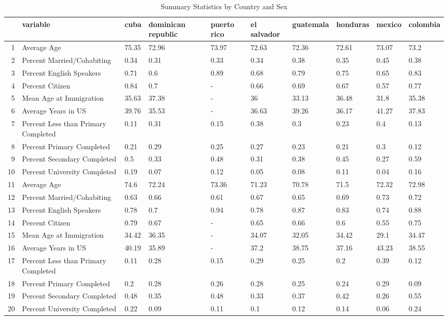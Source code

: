 \begin{table}[ht]
\centering
\hspace*{-1cm} %
\caption{Summary Statistics by Country and Sex} 
\label{table2}
\begingroup\small
\begin{tabular}{rlllllllll}
  \hline
 & variable & cuba & dominican republic & puerto rico & el salvador & guatemala & honduras & mexico & colombia \\ 
  \hline
1 & Average Age & 75.35 & 72.96 & 73.97 & 72.63 & 72.36 & 72.61 & 73.07 & 73.2 \\ 
  2 & Percent Married/Cohabiting & 0.34 & 0.31 & 0.33 & 0.34 & 0.38 & 0.35 & 0.45 & 0.38 \\ 
  3 & Percent English Speakers & 0.71 & 0.6 & 0.89 & 0.68 & 0.79 & 0.75 & 0.65 & 0.83 \\ 
  4 & Percent Citizen & 0.84 & 0.7 & - & 0.66 & 0.69 & 0.67 & 0.57 & 0.77 \\ 
  5 & Mean Age at Immigration & 35.63 & 37.38 & - & 36 & 33.13 & 36.48 & 31.8 & 35.38 \\ 
  6 & Average Years in US & 39.76 & 35.53 & - & 36.63 & 39.26 & 36.17 & 41.27 & 37.83 \\ 
  7 & Percent Less than Primary Completed & 0.11 & 0.31 & 0.15 & 0.38 & 0.3 & 0.23 & 0.4 & 0.13 \\ 
  8 & Percent Primary Completed & 0.21 & 0.29 & 0.25 & 0.27 & 0.23 & 0.21 & 0.3 & 0.12 \\ 
  9 & Percent Secondary Completed & 0.5 & 0.33 & 0.48 & 0.31 & 0.38 & 0.45 & 0.27 & 0.59 \\ 
  10 & Percent University Completed & 0.19 & 0.07 & 0.12 & 0.05 & 0.08 & 0.11 & 0.04 & 0.16 \\ 
  11 & Average Age & 74.6 & 72.24 & 73.36 & 71.23 & 70.78 & 71.5 & 72.32 & 72.98 \\ 
  12 & Percent Married/Cohabiting & 0.63 & 0.66 & 0.61 & 0.67 & 0.65 & 0.69 & 0.73 & 0.72 \\ 
  13 & Percent English Speakers & 0.78 & 0.7 & 0.94 & 0.78 & 0.87 & 0.83 & 0.74 & 0.88 \\ 
  14 & Percent Citizen & 0.79 & 0.67 & - & 0.65 & 0.66 & 0.6 & 0.55 & 0.75 \\ 
  15 & Mean Age at Immigration & 34.42 & 36.35 & - & 34.07 & 32.05 & 34.42 & 29.1 & 34.47 \\ 
  16 & Average Years in US & 40.19 & 35.89 & - & 37.2 & 38.75 & 37.16 & 43.23 & 38.55 \\ 
  17 & Percent Less than Primary Completed & 0.11 & 0.28 & 0.15 & 0.29 & 0.25 & 0.2 & 0.39 & 0.12 \\ 
  18 & Percent Primary Completed & 0.2 & 0.28 & 0.26 & 0.28 & 0.25 & 0.24 & 0.29 & 0.09 \\ 
  19 & Percent Secondary Completed & 0.48 & 0.35 & 0.48 & 0.33 & 0.37 & 0.42 & 0.26 & 0.55 \\ 
  20 & Percent University Completed & 0.22 & 0.09 & 0.11 & 0.1 & 0.12 & 0.14 & 0.06 & 0.24 \\ 
   \hline
\end{tabular}
\endgroup
\end{table}
